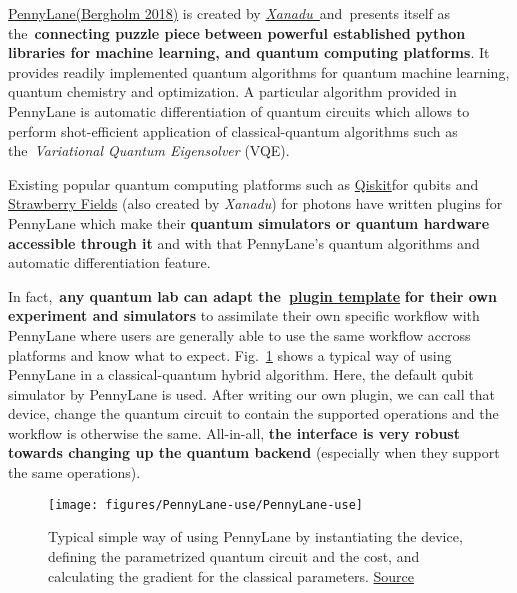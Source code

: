 \documentclass[%
 reprint,
 amsmath,amssymb,
 aps,
]{revtex4-1}
\begin{document}
\href{https://pennylane.ai/}{PennyLane}\protect\hyperlink{killoran2018}{(Bergholm
2018)} is created by
\emph{\href{https://www.xanadu.ai/}{Xanadu~}}and~presents itself as
the~\textbf{connecting puzzle piece} \textbf{between powerful
established python libraries for machine learning, and quantum computing
platforms}. It provides readily implemented quantum algorithms for
quantum machine learning, quantum chemistry and optimization. A
particular algorithm provided in PennyLane is automatic differentiation
of quantum circuits which allows to perform shot-efficient application
of classical-quantum algorithms such as the~\emph{Variational Quantum
Eigensolver} (VQE). ~~

Existing popular quantum computing platforms such as
\href{https://qiskit.org/}{Qiskit}for qubits and
\href{https://strawberryfields.readthedocs.io/en/stable/\#}{Strawberry
Fields} (also created by \emph{Xanadu}) for photons have written plugins
for PennyLane which make their \textbf{quantum simulators or quantum
hardware accessible through it} and with that PennyLane's quantum
algorithms and automatic differentiation feature.~

In fact,~\textbf{any quantum lab can adapt
the~}\href{https://github.com/XanaduAI/pennylane-plugin-template}{\textbf{plugin
template}} \textbf{for their own experiment and simulators} to
assimilate their own specific workflow with PennyLane where users are
generally able to use the same workflow accross platforms and know what
to expect. Fig.~{\ref{757073}} shows a typical way of
using PennyLane in a classical-quantum hybrid algorithm. Here, the
default qubit simulator by PennyLane is used. After writing our own
plugin, we can call that device, change the quantum circuit to contain
the supported operations and the workflow is otherwise the same.
All-in-all, \textbf{the interface is very robust towards changing up the
quantum backend} (especially when they support the same operations).
\begin{figure}[h!]
\begin{center}
\texttt{[image: figures/PennyLane-use/PennyLane-use]}
\caption{{Typical simple way of using PennyLane by instantiating the device,
defining the parametrized quantum circuit and the cost, and calculating
the gradient for the classical parameters.
\href{https://pennylane.readthedocs.io/en/stable/introduction/pennylane.html}{Source}
{\label{757073}}%
}}
\end{center}
\end{figure}
\end{document}
